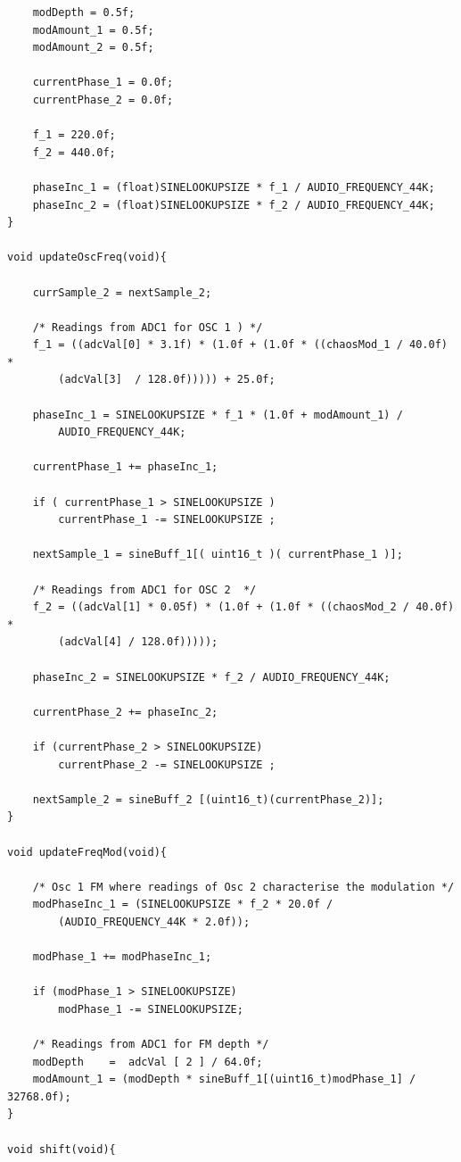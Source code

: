 \documentclass[12pt]{article}
\begin{document}
\begin{verbatim}
    modDepth = 0.5f;
    modAmount_1 = 0.5f;
    modAmount_2 = 0.5f;

    currentPhase_1 = 0.0f; 
    currentPhase_2 = 0.0f;
	
    f_1 = 220.0f; 
    f_2 = 440.0f;
	
    phaseInc_1 = (float)SINELOOKUPSIZE * f_1 / AUDIO_FREQUENCY_44K; 
    phaseInc_2 = (float)SINELOOKUPSIZE * f_2 / AUDIO_FREQUENCY_44K;
}

void updateOscFreq(void){
	
    currSample_2 = nextSample_2;
	
    /* Readings from ADC1 for OSC 1 ) */
    f_1 = ((adcVal[0] * 3.1f) * (1.0f + (1.0f * ((chaosMod_1 / 40.0f) * 
        (adcVal[3]  / 128.0f))))) + 25.0f;
				
    phaseInc_1 = SINELOOKUPSIZE * f_1 * (1.0f + modAmount_1) / 
        AUDIO_FREQUENCY_44K;
	
    currentPhase_1 += phaseInc_1;
				
    if ( currentPhase_1 > SINELOOKUPSIZE ) 
        currentPhase_1 -= SINELOOKUPSIZE ;
				
    nextSample_1 = sineBuff_1[( uint16_t )( currentPhase_1 )];
				
    /* Readings from ADC1 for OSC 2  */
    f_2 = ((adcVal[1] * 0.05f) * (1.0f + (1.0f * ((chaosMod_2 / 40.0f) * 
        (adcVal[4] / 128.0f)))));
				
    phaseInc_2 = SINELOOKUPSIZE * f_2 / AUDIO_FREQUENCY_44K;
	
    currentPhase_2 += phaseInc_2;
				
    if (currentPhase_2 > SINELOOKUPSIZE) 
        currentPhase_2 -= SINELOOKUPSIZE ;
				
    nextSample_2 = sineBuff_2 [(uint16_t)(currentPhase_2)];
}

void updateFreqMod(void){
	
    /* Osc 1 FM where readings of Osc 2 characterise the modulation */
    modPhaseInc_1 = (SINELOOKUPSIZE * f_2 * 20.0f / 
        (AUDIO_FREQUENCY_44K * 2.0f));
	
    modPhase_1 += modPhaseInc_1;	
				
    if (modPhase_1 > SINELOOKUPSIZE) 
        modPhase_1 -= SINELOOKUPSIZE;
										
    /* Readings from ADC1 for FM depth */
    modDepth    =  adcVal [ 2 ] / 64.0f;
    modAmount_1 = (modDepth * sineBuff_1[(uint16_t)modPhase_1] / 32768.0f);
}

void shift(void){


\end{verbatim}
\end{document}
